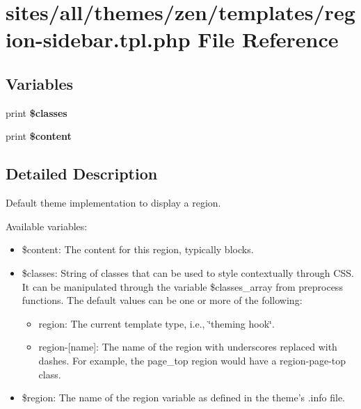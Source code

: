 \hypertarget{region-sidebar_8tpl_8php}{
\section{sites/all/themes/zen/templates/region-sidebar.tpl.php File Reference}
\label{region-sidebar_8tpl_8php}
}
\subsection*{Variables}
\begin{CompactItemize}
\item 
\hypertarget{region-sidebar_8tpl_8php_6d48ecbdbc70ca1812e665169b5fa1e2}{
print \textbf{\$classes}}
\label{region-sidebar_8tpl_8php_6d48ecbdbc70ca1812e665169b5fa1e2}

\item 
\hypertarget{region-sidebar_8tpl_8php_b7b7210f43aa78e34f0b202de894a74c}{
print \textbf{\$content}}
\label{region-sidebar_8tpl_8php_b7b7210f43aa78e34f0b202de894a74c}

\end{CompactItemize}


\subsection{Detailed Description}
Default theme implementation to display a region.

Available variables:\begin{itemize}
\item \$content: The content for this region, typically blocks.\item \$classes: String of classes that can be used to style contextually through CSS. It can be manipulated through the variable \$classes\_\-array from preprocess functions. The default values can be one or more of the following:\begin{itemize}
\item region: The current template type, i.e., \char`\"{}theming hook\char`\"{}.\item region-\mbox{[}name\mbox{]}: The name of the region with underscores replaced with dashes. For example, the page\_\-top region would have a region-page-top class.\end{itemize}
\item \$region: The name of the region variable as defined in the theme's .info file.\end{itemize}


